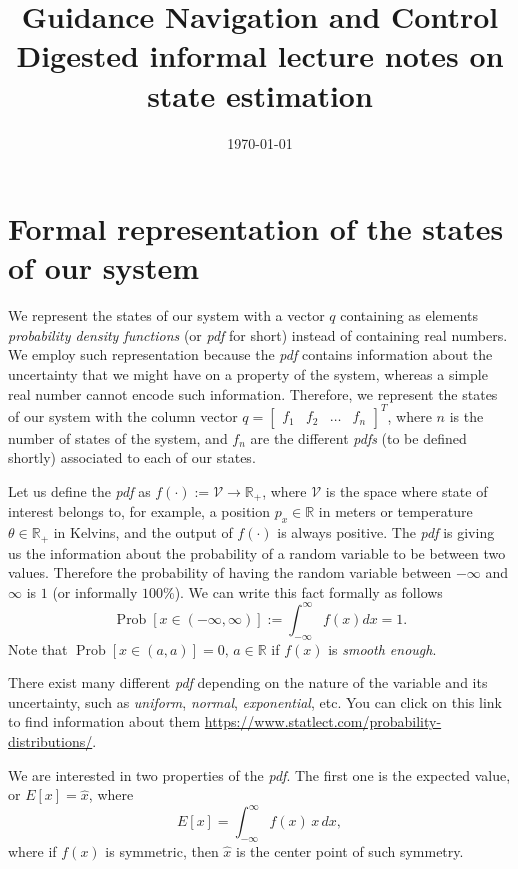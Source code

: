 \documentclass[11pt,a4paper]{article}
\title{Guidance Navigation and Control \\ Digested informal lecture notes on state estimation}
\author{}
\date{\today}
\begin{document}
\maketitle

\section{Formal representation of the states of our system}
We represent the states of our system with a vector $q$ containing as elements \emph{probability density functions} (or \emph{pdf} for short) instead of containing real numbers. We employ such representation because the \emph{pdf} contains information about the uncertainty that we might have on a property of the system, whereas a simple real number cannot encode such information. Therefore, we represent the states of our system with the column vector $q = \begin{bmatrix} f_1 & f_2 & \dots & f_n \end{bmatrix}^T$, where $n$ is the number of states of the system, and $f_n$ are the different \emph{pdfs} (to be defined shortly) associated to each of our states.

Let us define the \emph{pdf} as $f(\cdot) := \mathcal{V} \to \mathbb{R}_+$, where $\mathcal{V}$ is the space where state of interest belongs to, for example, a position $p_x\in\mathbb{R}$ in meters or temperature $\theta\in\mathbb{R}_+$ in Kelvins, and the output of $f(\cdot)$ is always positive. The \emph{pdf} is giving us the information about the probability of a random variable to be between two values. Therefore the probability of having the random variable between $-\infty$ and $\infty$ is $1$ (or informally $100\%$). We can write this fact formally as follows
\begin{equation}
\operatorname{Prob}[x\in (-\infty,\infty)] := \int_{-\infty}^{\infty} f(x) dx = 1.
	\label{eq: fus}
\end{equation}
Note that $\operatorname{Prob}[x\in (a,a)] = 0, \, a\in\mathbb{R}$ if $f(x)$ is 
\emph{smooth enough}.

There exist many different \emph{pdf} depending on the nature of the variable and its uncertainty, such as \emph{uniform}, \emph{normal}, \emph{exponential}, etc. You can click on this link to find information about them \url{https://www.statlect.com/probability-distributions/}.

We are interested in two properties of the \emph{pdf}. The first one is the expected value, or $E[x] = \hat x$, where
\begin{equation}
	E[x] = \int_{-\infty}^{\infty} f(x)\, x \,dx, \label{eq: ep}
\end{equation}
where if $f(x)$ is symmetric, then $\hat x$ is the center point of such symmetry.
\end{document}
